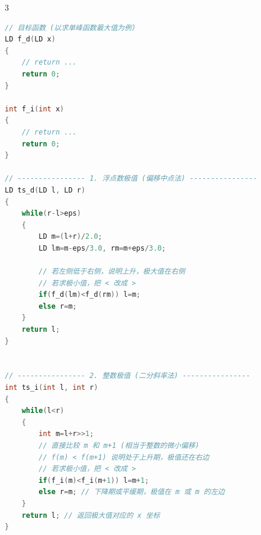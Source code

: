 \documentclass[10pt,landscape,a4paper]{article}
\begin{document}
\begin{multicols*}{3}
\begin{lstlisting}[language=C++]
// 目标函数 (以求单峰函数最大值为例)
LD f_d(LD x)
{
    // return ...
    return 0; 
}

int f_i(int x)
{
    // return ...
    return 0;
}

// ---------------- 1. 浮点数极值 (偏移中点法) ----------------
LD ts_d(LD l, LD r)
{
    while(r-l>eps)
    {
        LD m=(l+r)/2.0;
        LD lm=m-eps/3.0, rm=m+eps/3.0;
        
        // 若左侧低于右侧，说明上升，极大值在右侧
        // 若求极小值，把 < 改成 >
        if(f_d(lm)<f_d(rm)) l=m;
        else r=m;
    }
    return l;
}


// ---------------- 2. 整数极值 (二分斜率法) ----------------
int ts_i(int l, int r)
{
    while(l<r)
    {
        int m=l+r>>1;
        // 直接比较 m 和 m+1 (相当于整数的微小偏移)
        // f(m) < f(m+1) 说明处于上升期，极值还在右边
        // 若求极小值，把 < 改成 >
        if(f_i(m)<f_i(m+1)) l=m+1;
        else r=m; // 下降期或平缓期，极值在 m 或 m 的左边
    }
    return l; // 返回极大值对应的 x 坐标
}
\end{lstlisting}

\end{multicols*}
\end{document}
